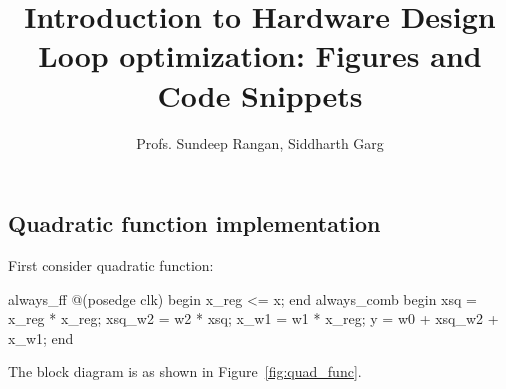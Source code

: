 \documentclass[11pt]{article}
\begin{document}
\title{Introduction to Hardware Design\\
Loop optimization:  Figures and Code Snippets}
\author{Profs. Sundeep Rangan, Siddharth Garg}
\date{}

\maketitle
\subsection{Quadratic function implementation}

First consider quadratic function:

\begin{systemverilogcode}
always_ff @(posedge clk) begin
  x_reg <= x;
end
always_comb begin
  xsq = x_reg * x_reg;
  xsq_w2 = w2 * xsq;
  x_w1 = w1 * x_reg;
  y = w0 + xsq_w2 + x_w1;
end
\end{systemverilogcode}

 
The block diagram is as shown in Figure~\ref{fig:quad_func}.
\end{document}
